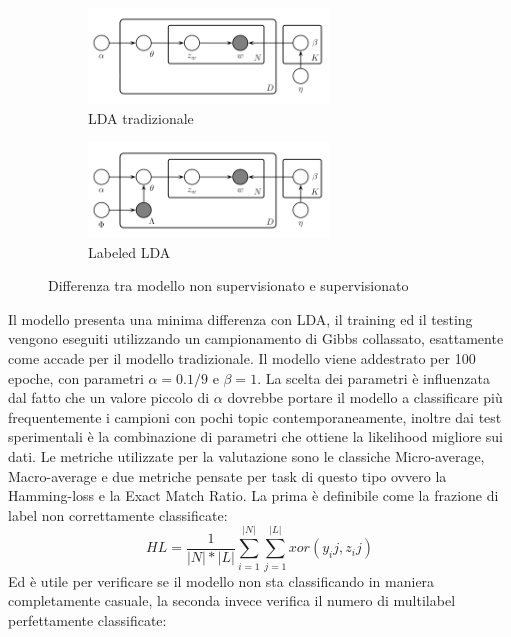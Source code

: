 \documentclass[technote]{IEEEtran}
\begin{document}
\begin{figure}[H]
\vspace{-5mm}
  \begin{subfigure}[b]{0.45\textwidth}
  \centering
    \includegraphics[width=0.7\textwidth]{images/lda}
    \caption{LDA tradizionale}
  \end{subfigure}
   \hfill
  \begin{subfigure}[b]{0.45\textwidth}
  \centering
    \includegraphics[width=0.7\textwidth]{images/llda}
    \caption{Labeled LDA}
  \end{subfigure}
  \caption{Differenza tra modello non supervisionato e supervisionato}
  \label{fig_llda}
\end{figure}
Il modello presenta una minima differenza con LDA, il training ed il testing vengono eseguiti utilizzando un campionamento di Gibbs collassato, esattamente come accade per il modello tradizionale. Il modello viene addestrato per 100 epoche, con parametri $ \alpha = 0.1 / 9 $ e $ \beta = 1 $. La scelta dei parametri è influenzata dal fatto che un valore piccolo di $ \alpha $ dovrebbe portare il modello a classificare più frequentemente i campioni con pochi topic contemporaneamente, inoltre dai test sperimentali è la combinazione di parametri che ottiene la likelihood migliore sui dati.
Le metriche utilizzate per la valutazione sono le classiche Micro-average, Macro-average e due metriche pensate per task di questo tipo ovvero la Hamming-loss \cite{6772729} e la Exact Match Ratio. La prima è definibile come la frazione di label non correttamente classificate:
\begin{equation}
HL=\frac{1}{|N|*|L|}\sum_{i=1}^{|N|}\sum_{j=1}^{|L|}xor(y_ij, z_ij)
\end{equation}
Ed è utile per verificare se il modello non sta classificando in maniera completamente casuale, la seconda invece verifica il numero di multilabel perfettamente classificate:\\
\end{document}

